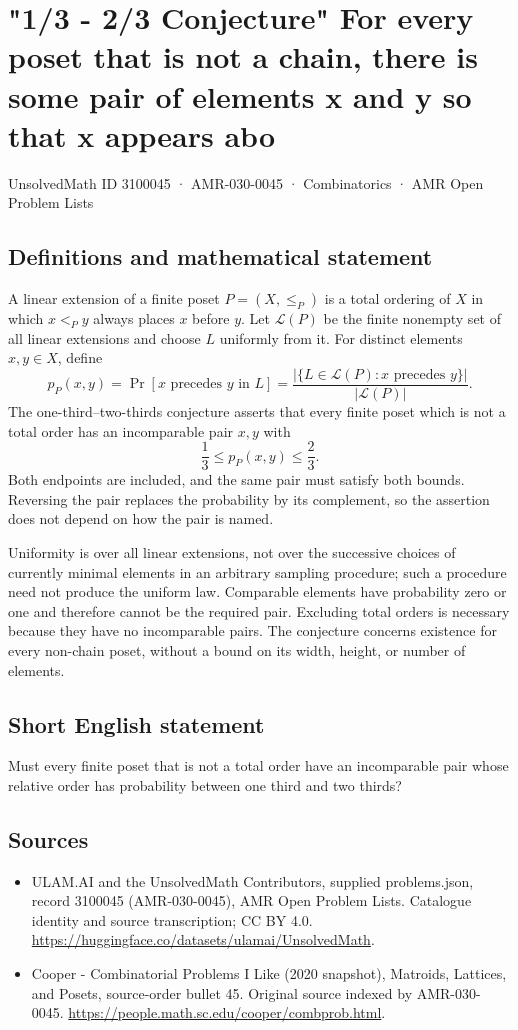 \documentclass[11pt,a4paper]{article}
\begin{document}
\section*{"1/3 - 2/3 Conjecture" For every poset that is not a chain, there is some pair of elements x and y so that x appears abo}\label{3100045}
{\small UnsolvedMath ID 3100045 · AMR-030-0045 · Combinatorics · AMR Open Problem Lists}
\subsection{Definitions and mathematical statement}
A linear extension of a finite poset $P=(X,\le_P)$ is a total
ordering of $X$ in which $x<_P y$ always places $x$ before $y$.
Let $\mathcal L(P)$ be the finite nonempty set of all linear
extensions and choose $L$ uniformly from it. For distinct
elements $x,y\in X$, define
\[
 p_P(x,y)=\Pr[x\text{ precedes }y\text{ in }L]
        =\frac{|\{L\in\mathcal L(P):x\text{ precedes }y\}|}
                    {|\mathcal L(P)|}.
\]
The one-third--two-thirds conjecture asserts that every finite
poset which is not a total order has an incomparable pair $x,y$
with
\[
                       \frac13\le p_P(x,y)\le\frac23.
\]
Both endpoints are included, and the same pair must satisfy both
bounds. Reversing the pair replaces the probability by its
complement, so the assertion does not depend on how the pair is
named.

Uniformity is over all linear extensions, not over the successive
choices of currently minimal elements in an arbitrary sampling
procedure; such a procedure need not produce the uniform law.
Comparable elements have probability zero or one and therefore
cannot be the required pair. Excluding total orders is necessary
because they have no incomparable pairs. The conjecture concerns
existence for every non-chain poset, without a bound on its width,
height, or number of elements.
\subsection{Short English statement}
Must every finite poset that is not a total order have an incomparable pair whose relative order has probability between one third and two thirds?
\subsection{Sources}
\begin{itemize}
\item[S1] ULAM.AI and the UnsolvedMath Contributors, supplied problems.json, record 3100045 (AMR-030-0045), AMR Open Problem Lists. Catalogue identity and source transcription; CC BY 4.0.
\url{https://huggingface.co/datasets/ulamai/UnsolvedMath}.
\item[S2] Cooper - Combinatorial Problems I Like (2020 snapshot), Matroids, Lattices, and Posets, source-order bullet 45. Original source indexed by AMR-030-0045.
\url{https://people.math.sc.edu/cooper/combprob.html}.
\end{itemize}
\end{document}
